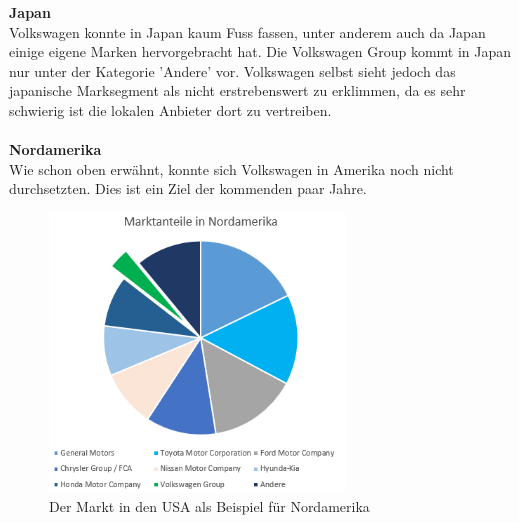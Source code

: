 \documentclass[12pt]{article}
\begin{document}
\textbf{Japan} \\
Volkswagen konnte in Japan kaum Fuss fassen, unter anderem auch da Japan einige eigene Marken hervorgebracht hat.  Die Volkswagen Group kommt in Japan nur unter der Kategorie 'Andere' vor. Volkswagen selbst sieht jedoch das japanische Marksegment als nicht erstrebenswert zu erklimmen, da es sehr schwierig ist die lokalen Anbieter dort zu vertreiben.
\\\\
\textbf{Nordamerika}\\
Wie schon oben erwähnt, konnte sich Volkswagen in Amerika noch nicht durchsetzten. Dies ist ein Ziel der kommenden paar Jahre. 
\begin{figure}[here!]
\centering
\includegraphics[width=0.7\textwidth]{images/maam}
\caption{Der Markt in den USA als Beispiel für Nordamerika}
\label{fig:marktnordamerika}
\end{figure}\FloatBarrier
\noindent
\end{document}
